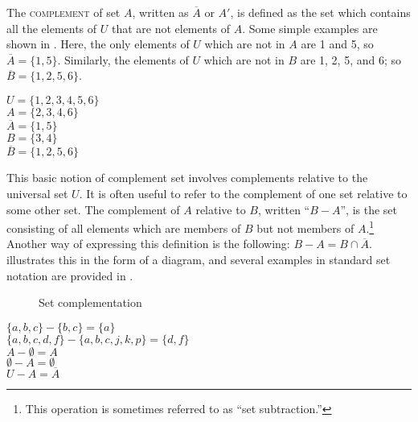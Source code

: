 The \textsc{complement} of set $A$, written as $\overline{A}$ or $A'$, is defined as the set which contains all the elements of $U$ that are not elements of $A$. Some simple examples are shown in . Here, the only elements of $U$ which are not in $A$ are 1 and 5, so
$\overline{A} = \{1,5\}$. Similarly, the elements of $U$ which are not in $B$ are 1, 2, 5, and 6; so $\overline{B} = \{1,2,5,6\}$.


\ea \label{ex:13.17}
$U = \{1,2,3,4,5,6\}$\\
$A = \{2,3,4,6\}$\\
$\overline{A} = \{1,5\}$\\
$B = \{3,4\}$\\
$\overline{B} = \{1,2,5,6\}$
\z


This basic notion of complement set involves complements relative to the universal set $U$. It is often useful to refer to the complement of one set relative to some other set. The complement of $A$ relative to $B$, written “$B-A$”, is the set consisting of all elements which are members of $B$ but not members of $A$.\footnote{This operation is sometimes referred to as “set subtraction.”} Another way of expressing this definition is the following: $B-A = B\cap\overline{A}$.  illustrates this in the form of a diagram, and several examples in standard set notation are provided in .

\begin{figure}
\caption{\label{fig:13:4} Set complementation}
\end{figure}

\ea \label{ex:13.18}
$\{a,b,c\} - \{b,c\} = \{a\}$\\
$\{a,b,c,d,f\} - \{a,b,c,j,k,p\} = \{d,f\}$\\
$A - ∅ = A$\\
$∅ - A = ∅$\\
$U - A = \overline{A}$
\z



